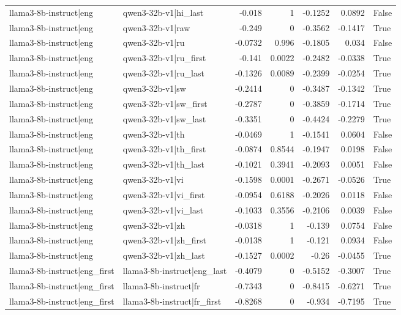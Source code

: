 \begin{table}
\begin{tabular}{l l r r r r l}
llama3-8b-instruct|eng & qwen3-32b-v1|hi_last & -0.018 & 1 & -0.1252 & 0.0892 & False \\
llama3-8b-instruct|eng & qwen3-32b-v1|raw & -0.249 & 0 & -0.3562 & -0.1417 & True \\
llama3-8b-instruct|eng & qwen3-32b-v1|ru & -0.0732 & 0.996 & -0.1805 & 0.034 & False \\
llama3-8b-instruct|eng & qwen3-32b-v1|ru_first & -0.141 & 0.0022 & -0.2482 & -0.0338 & True \\
llama3-8b-instruct|eng & qwen3-32b-v1|ru_last & -0.1326 & 0.0089 & -0.2399 & -0.0254 & True \\
llama3-8b-instruct|eng & qwen3-32b-v1|sw & -0.2414 & 0 & -0.3487 & -0.1342 & True \\
llama3-8b-instruct|eng & qwen3-32b-v1|sw_first & -0.2787 & 0 & -0.3859 & -0.1714 & True \\
llama3-8b-instruct|eng & qwen3-32b-v1|sw_last & -0.3351 & 0 & -0.4424 & -0.2279 & True \\
llama3-8b-instruct|eng & qwen3-32b-v1|th & -0.0469 & 1 & -0.1541 & 0.0604 & False \\
llama3-8b-instruct|eng & qwen3-32b-v1|th_first & -0.0874 & 0.8544 & -0.1947 & 0.0198 & False \\
llama3-8b-instruct|eng & qwen3-32b-v1|th_last & -0.1021 & 0.3941 & -0.2093 & 0.0051 & False \\
llama3-8b-instruct|eng & qwen3-32b-v1|vi & -0.1598 & 0.0001 & -0.2671 & -0.0526 & True \\
llama3-8b-instruct|eng & qwen3-32b-v1|vi_first & -0.0954 & 0.6188 & -0.2026 & 0.0118 & False \\
llama3-8b-instruct|eng & qwen3-32b-v1|vi_last & -0.1033 & 0.3556 & -0.2106 & 0.0039 & False \\
llama3-8b-instruct|eng & qwen3-32b-v1|zh & -0.0318 & 1 & -0.139 & 0.0754 & False \\
llama3-8b-instruct|eng & qwen3-32b-v1|zh_first & -0.0138 & 1 & -0.121 & 0.0934 & False \\
llama3-8b-instruct|eng & qwen3-32b-v1|zh_last & -0.1527 & 0.0002 & -0.26 & -0.0455 & True \\
llama3-8b-instruct|eng_first & llama3-8b-instruct|eng_last & -0.4079 & 0 & -0.5152 & -0.3007 & True \\
llama3-8b-instruct|eng_first & llama3-8b-instruct|fr & -0.7343 & 0 & -0.8415 & -0.6271 & True \\
llama3-8b-instruct|eng_first & llama3-8b-instruct|fr_first & -0.8268 & 0 & -0.934 & -0.7195 & True \\

\end{tabular}
\end{table}
